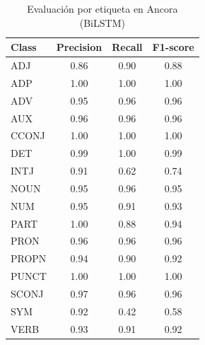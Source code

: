\begin{table}[H]
\centering
\small
\begin{tabular}{lccc}
\hline
\textbf{Class} & \textbf{Precision} & \textbf{Recall} & \textbf{F1-score} \\
\hline
ADJ   & 0.86 & 0.90 & 0.88 \\
ADP   & 1.00 & 1.00 & 1.00 \\
ADV   & 0.95 & 0.96 & 0.96 \\
AUX   & 0.96 & 0.96 & 0.96 \\
CCONJ & 1.00 & 1.00 & 1.00 \\
DET   & 0.99 & 1.00 & 0.99 \\
INTJ  & 0.91 & 0.62 & 0.74 \\
NOUN  & 0.95 & 0.96 & 0.95 \\
NUM   & 0.95 & 0.91 & 0.93 \\
PART  & 1.00 & 0.88 & 0.94 \\
PRON  & 0.96 & 0.96 & 0.96 \\
PROPN & 0.94 & 0.90 & 0.92 \\
PUNCT & 1.00 & 1.00 & 1.00 \\
SCONJ & 0.97 & 0.96 & 0.96 \\
SYM   & 0.92 & 0.42 & 0.58 \\
VERB  & 0.93 & 0.91 & 0.92 \\
\hline
\end{tabular}
\caption{Evaluación por etiqueta en Ancora (BiLSTM)}
\end{table}